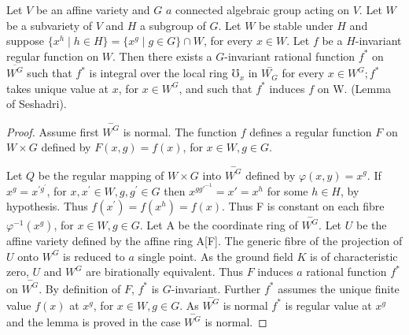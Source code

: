\setcounter{lem}{0}
 \begin{lem}\label{chap4:lem1}%
   Let $V$ be an affine variety and $G$ $a$ connected algebraic group
   acting on $V$. Let $W$ be a subvariety of $V$ and $H$ a
   subgroup of  $G$. Let $W$ be stable under $H$ and suppose $\bigg\{
   x^h \mid h \in H \bigg\} = \bigg\{ x^g \mid g \in G \bigg\} \cap
   W$, for every $x \in W$. Let $f$ be a $H$-invariant regular
   function on $W$. Then there exists a $G$-invariant rational
   function $f^\ast$ on $ \overline  {W^G}$ such that $f^\ast$ is
   integral over the local ring $\mho_x$ in $\overset{-}{W_G}$ for
   every $x \in W^G ; f^\ast$ takes unique value at $x$, for $x \in
   W^G$, and such that $f^\ast$ induces $f$ on W. (Lemma of Seshadri). 
 \end{lem} 
 
\begin{proof}
  Assume first $\overset{-}{W^G}$ is normal. The function $f$ defines
  a regular function $F$ on $W \times G$ defined by $F(x,g) = f(x)$,
  for $x \in W, g \in G$. 

  Let $Q$ be the regular mapping of $W \times G$ into
  $\overset{-}{W^G}$ defined by $\varphi(x,y)=x^g$. If $x^g =
  x^{\prime g^\prime}$, for $x, x^\prime \in W, g, g^\prime \in G$
  then $x^{gg'^{- 1}} = x' = x^h$ for some $h \in H$, by
  hypothesis. Thus $f(x^\prime) = f(x^h) = f(x)$. Thus F is constant
  on each fibre $\varphi^{-1}(x^g)$, for $x \in W, g \in G$. Let A be
  the coordinate ring of $\overset{-}{W^G}$. Let $U$ be the affine
  variety defined by the affine ring A[F]. The generic fibre of the
  projection of $U$ onto $W^G$ is reduced to $a$ single point. As the
  ground field $K$ is of characteristic zero, $U$ and $W^G$ are
  birationally equivalent. Thus $F$ induces $a$ rational function
  $f^\ast$ on $\overset{-}{W^G}$. By definition of $F$, $f^\ast$ is
  $G$-invariant. Further $f^\ast$ assumes the unique finite value $f(x)$
  at $x^g$, for $x \in W, g \in G$. As $\overset{-}{W^G}$ is normal
  $f^\ast$ is regular value at $x^g$ and the lemma is proved in the
  case $\overset{-}{W^G}$ is normal. 
\end{proof}
 
